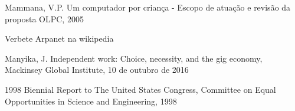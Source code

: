 \documentclass[
12pt,		%
openright,	%
twoside,  %
a4paper,			%
chapter=TITLE,		%
english,			%
french,				%
spanish,			%
brazil				%
]{USPSC-classe/USPSC}
\begin{document}
\begin{flushleft}
\begin{flushleft}
\begin{flushleft}
\begin{flushleft}
[MAMMANA, 2005a] Mammana, V.P. Um computador por crian\c{c}a - Escopo de atua\c{c}\~ao e revis\~ao da proposta OLPC, 2005
\end{flushleft}


\end{flushleft}


\end{flushleft}


\end{flushleft}


\begin{flushleft}
\begin{flushleft}
\begin{flushleft}
\begin{flushleft}
[ARPANET, 2022] Verbete Arpanet na wikipedia
\end{flushleft}


\end{flushleft}


\end{flushleft}


\end{flushleft}


\begin{flushleft}
\begin{flushleft}
\begin{flushleft}
\begin{flushleft}
[Manyika, 2016] Manyika, J. Independent work: Choice, necessity, and the gig economy, Mackinsey Global Institute, 10 de outubro de 2016
\end{flushleft}


\end{flushleft}


\end{flushleft}


\end{flushleft}


\begin{flushleft}
\begin{flushleft}
\begin{flushleft}
\begin{flushleft}
[CONGRESS, 1998] 1998 Biennial Report to The United States Congress, Committee on Equal Opportunities in Science and Engineering, 1998
\end{flushleft}


\end{flushleft}


\end{flushleft}


\end{flushleft}
\end{document}
